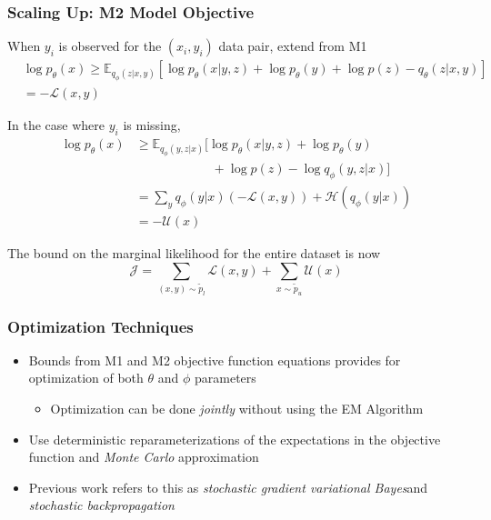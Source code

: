 \documentclass{beamer}
\begin{document}
\begin{frame}
  \frametitle{Scaling Up: M2 Model Objective}

  When $y_i$ is observed for the $(x_i,y_i)$ data pair, extend from M1
  \begin{align*}
    &\log p_\theta (x) \ge \mathbb{E}_{q_\phi (z|x,y)}
       [\log p_\theta (x|y,z) + \log p_\theta (y) + \log p(z) -
         q_\theta (z|x,y)] \\
       &= - \mathcal{L}(x,y)
  \end{align*}

  In the case where $y_i$ is missing,
  \begin{align*}
    \log p_\theta (x) &\ge \mathbb{E}_{q_\phi (y,z|x)}
         [\log p_\theta (x|y,z) + \log p_\theta (y) \\
           &\qquad\qquad\qquad + \log p(z) - \log q_\phi (y,z|x)] \\
         &= \sum_y q_\phi (y|x) ( - \mathcal{L}(x,y))
         + \mathcal{H}(q_\phi (y|x)) \\
         &= - \mathcal{U}(x)
  \end{align*}

  The bound on the marginal likelihood for the entire dataset is
  now\footnotemark
  \[
  \mathcal{J} = \sum_{(x,y) \sim \tilde{p}_l} \mathcal{L}(x,y)
    + \sum_{x \sim \tilde{p}_u} \mathcal{U}(x)
    \]

\end{frame}

\begin{frame}
  \frametitle{Optimization Techniques}

  \begin{itemize}
  \item Bounds from M1 and M2 objective function equations provides
    for optimization of both $\theta$ and $\phi$ parameters
    \begin{itemize}
    \item Optimization can be done \textit{jointly} without using the EM
      Algorithm
    \end{itemize}
  \item Use deterministic reparameterizations of the expectations in
    the objective function and \textit{Monte Carlo} approximation
  \item Previous work refers to this as \textit{stochastic gradient
    variational Bayes}\footnotemark and
    \textit{stochastic backpropagation}\footnotemark
  \end{itemize}


\end{frame}
\end{document}
